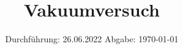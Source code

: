 

\subject{V70}
\title{Vakuumversuch}
\date{%
  Durchführung: 26.06.2022
  \hspace{3em}
  Abgabe: \today
}



\maketitle
\thispagestyle{empty}
\tableofcontents
\newpage







\printbibliography{}



